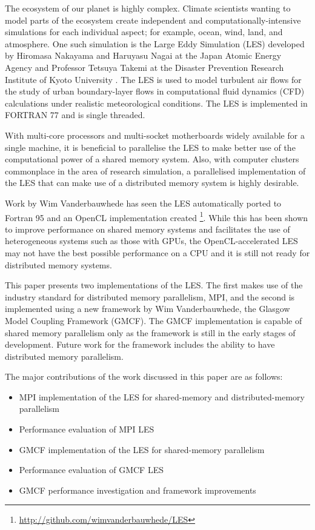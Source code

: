 The ecosystem of our planet is highly complex. Climate scientists wanting to
model parts of the ecosystem create independent and computationally-intensive
simulations for each individual aspect; for example, ocean, wind, land, and
atmosphere. One such simulation is the Large Eddy Simulation (LES) developed by
Hiromasa Nakayama and Haruyasu Nagai at the Japan Atomic Energy Agency and
Professor Tetsuya Takemi at the Disaster Prevention Research Institute of Kyoto
University \cite{Nakayama2011,Nakayama2012}. The LES is used to model turbulent
air flows for the study of urban boundary-layer flows in computational fluid
dynamics (CFD) calculations under realistic meteorological conditions. The LES
is implemented in FORTRAN 77 and is single threaded.

With multi-core processors and multi-socket motherboards widely available for a
single machine, it is beneficial to parallelise the LES to make better use of
the computational power of a shared memory system. Also, with computer clusters
commonplace in the area of research simulation, a parallelised implementation of
the LES that can make use of a distributed memory system is highly desirable.

Work by Wim Vanderbauwhede has seen the LES automatically ported to Fortran 95
and an OpenCL implementation created
\footnote{\url{http://github.com/wimvanderbauwhede/LES}}. While this has been
shown to improve performance on shared memory systems and facilitates the use of
heterogeneous systems such as those with GPUs, the OpenCL-accelerated LES may
not have the best possible performance on a CPU and it is still not ready for
distributed memory systems.

This paper presents two implementations of the LES. The first makes use of the
industry standard for distributed memory parallelism, MPI, and the second is
implemented using a new framework by Wim Vanderbauwhede, the Glasgow Model
Coupling Framework (GMCF). The GMCF implementation is capable of shared memory
parallelism only as the framework is still in the early stages of development.
Future work for the framework includes the ability to have distributed memory
parallelism.

The major contributions of the work discussed in this paper are as follows:

\begin{itemize}[noitemsep,nolistsep]

    \item MPI implementation of the LES for shared-memory and distributed-memory
    parallelism

    \item Performance evaluation of MPI LES

    \item GMCF implementation of the LES for shared-memory parallelism

    \item Performance evaluation of GMCF LES

    \item GMCF performance investigation and framework improvements

\end{itemize}

